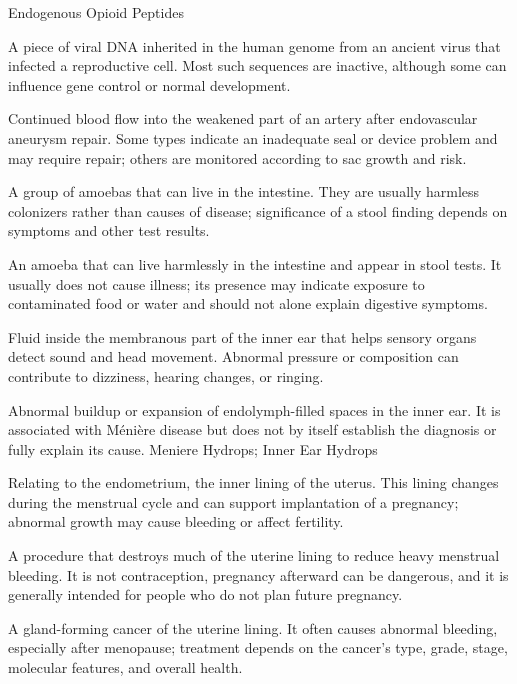\synonyms
Endogenous Opioid Peptides

 A piece of viral DNA inherited in the human genome from an ancient virus that infected a reproductive cell. Most such sequences are inactive, although some can influence gene control or normal development.

 Continued blood flow into the weakened part of an artery after endovascular aneurysm repair. Some types indicate an inadequate seal or device problem and may require repair; others are monitored according to sac growth and risk.

 A group of amoebas that can live in the intestine. They are usually harmless colonizers rather than causes of disease; significance of a stool finding depends on symptoms and other test results.

 An amoeba that can live harmlessly in the intestine and appear in stool tests. It usually does not cause illness; its presence may indicate exposure to contaminated food or water and should not alone explain digestive symptoms.

 Fluid inside the membranous part of the inner ear that helps sensory organs detect sound and head movement. Abnormal pressure or composition can contribute to dizziness, hearing changes, or ringing.

 Abnormal buildup or expansion of endolymph-filled spaces in the inner ear. It is associated with Ménière disease but does not by itself establish the diagnosis or fully explain its cause.
\synonyms
Meniere Hydrops; Inner Ear Hydrops

 Relating to the endometrium, the inner lining of the uterus. This lining changes during the menstrual cycle and can support implantation of a pregnancy; abnormal growth may cause bleeding or affect fertility.

 A procedure that destroys much of the uterine lining to reduce heavy menstrual bleeding. It is not contraception, pregnancy afterward can be dangerous, and it is generally intended for people who do not plan future pregnancy.

 A gland-forming cancer of the uterine lining. It often causes abnormal bleeding, especially after menopause; treatment depends on the cancer’s type, grade, stage, molecular features, and overall health.

